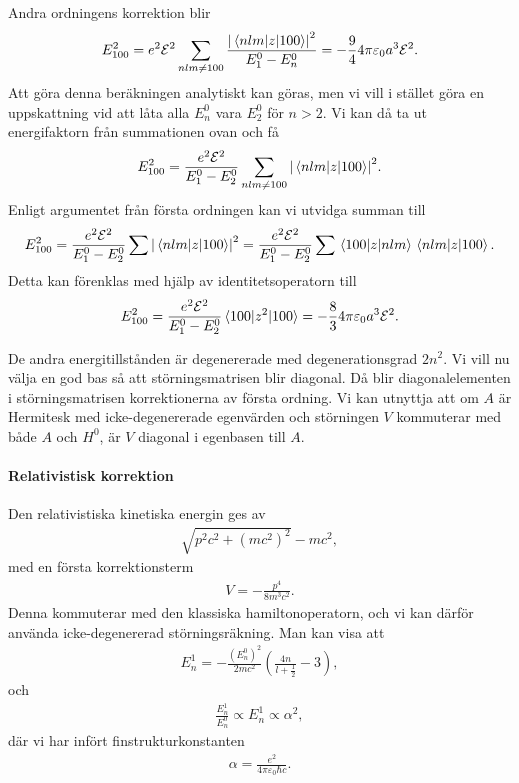 Andra ordningens korrektion blir
\begin{align*}
	E_{100}^{2} = e^{2}\mathcal{E}^{2}\sum\limits_{nlm \neq 100}\frac{\abs{\mel{nlm}{z}{100}}^{2}}{E_{1}^{0} - E_{n}^{0}} = -\frac{9}{4}4\pi\varepsilon_{0}a^{3}\mathcal{E}^{2}.
\end{align*}
Att göra denna beräkningen analytiskt kan göras, men vi vill i stället göra en uppskattning vid att låta alla $E_{n}^{0}$ vara $E_{2}^{0}$ för $n > 2$. Vi kan då ta ut energifaktorn från summationen ovan och få
\begin{align*}
	E_{100}^{2} = \frac{e^{2}\mathcal{E}^{2}}{E_{1}^{0} - E_{2}^{0}}\sum\limits_{nlm \neq 100}\abs{\mel{nlm}{z}{100}}^{2}.
\end{align*}
Enligt argumentet från första ordningen kan vi utvidga summan till
\begin{align*}
	E_{100}^{2} = \frac{e^{2}\mathcal{E}^{2}}{E_{1}^{0} - E_{2}^{0}}\sum\abs{\mel{nlm}{z}{100}}^{2} = \frac{e^{2}\mathcal{E}^{2}}{E_{1}^{0} - E_{2}^{0}}\sum\mel{100}{z}{nlm}\mel{nlm}{z}{100}.
\end{align*}
Detta kan förenklas med hjälp av identitetsoperatorn till
\begin{align*}
	E_{100}^{2} = \frac{e^{2}\mathcal{E}^{2}}{E_{1}^{0} - E_{2}^{0}}\expval{z^{2}}{100} = -\frac{8}{3}4\pi\varepsilon_{0}a^{3}\mathcal{E}^{2}.
\end{align*}

De andra energitillstånden är degenererade med degenerationsgrad $2n^{2}$. Vi vill nu välja en god bas så att störningsmatrisen blir diagonal. Då blir diagonalelementen i störningsmatrisen korrektionerna av första ordning. Vi kan utnyttja att om $A$ är Hermitesk med icke-degenererade egenvärden och störningen $V$ kommuterar med både $A$ och $H^{0}$, är $V$ diagonal i egenbasen till $A$.

\paragraph{Relativistisk korrektion}
Den relativistiska kinetiska energin ges av
\begin{align*}
	\sqrt{p^{2}c^{2} + (mc^{2})^{2}} - mc^{2},
\end{align*}
med en första korrektionsterm
\begin{align*}
	V = -\frac{p^{4}}{8m^{3}c^{2}}.
\end{align*}
Denna kommuterar med den klassiska hamiltonoperatorn, och vi kan därför använda icke-degenererad störningsräkning. Man kan visa att
\begin{align*}
	E_{n}^{1} = -\frac{(E_{n}^{0})^{2}}{2mc^{2}}\left(\frac{4n}{l + \frac{1}{2}} - 3\right),
\end{align*}
och
\begin{align*}
	\frac{E_{n}^{1}}{E_{n}^{0}}\propto E_{n}^{1}\propto\alpha^{2},
\end{align*}
där vi har infört finstrukturkonstanten
\begin{align*}
	\alpha = \frac{e^{2}}{4\pi\varepsilon_{0}\hbar c}.
\end{align*}

